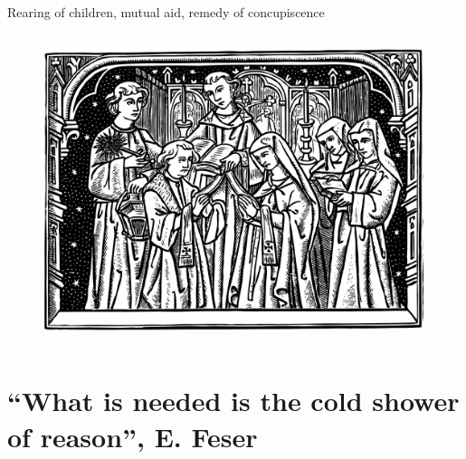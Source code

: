 \documentclass[xcolor=dvipsnames]{beamer}
\begin{document}
\begin{frame}[fragile]{Rearing of children, mutual aid, remedy of concupiscence}
  \begin{columns}[T] %
    \begin{column}{0.8\textwidth}
      \begin{figure}[H]
        \centering
        \includegraphics[width=0.99\textwidth]{marriage}
      \end{figure}
    \end{column}%
  \end{columns}
\end{frame}


\section{``What is needed is the cold shower of reason'', E. Feser}
\end{document}
